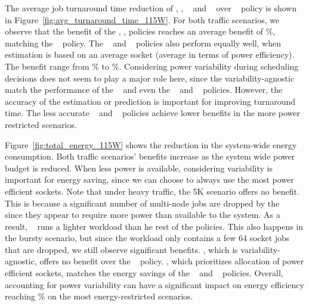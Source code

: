 The average job turnaround time reduction of \PESched, \PEVASched, \PRVSSched~ and \PMCVSSched~ over \DefaultSched~ policy is shown in Figure~\ref{fig:avg_turnaround_time_115W}. 
For both traffic scenarios, we observe that the benefit of the  \PESched, \PEVASched, policies reaches an average benefit of \AvgJTT\%, matching the \IVSSched~ policy.  
The \PESched~ and \PEVASched~ policies also perform equally well, when estimation is based on an average socket (average in terms of power efficiency).
The benefit range from \EstMaxJTT\% to \EstMinJTT\%.
Considering power variability during scheduling decisions does not seem to play a major role here, since the variability-agnostic \PESched~ match the performance of the \PEVASched~ and even 
the \PRVSSched~ and \PMCVSSched~ policies.  However, the accuracy of the estimation or prediction is important for improving turnaround time.  The less accurate  \PESched~ and \PEVASched~ policies achieve lower benefits in the more power restricted scenarios.

Figure~\ref{fig:total_energy_115W} shows the reduction in the system-wide energy consumption.  
Both traffic scenarios' benefits increase as the system wide power budget is reduced.
When less power is available, considering variability is important for energy saving, since we can choose to always use the most power efficient sockets.  
Note that under heavy traffic, the 5K scenario offers no benefit.  This is because a significant number of multi-node jobs are dropped by the \DefaultSched~ since they appear to require more 
power than available to the system.  As a result, \DefaultSched~ runs a lighter workload than he rest of the policies.  This also happens in the bursty scenario, but since the workload only contains
a few 64 socket jobs that are dropped, we still observe significant benefits. 
\PESched, which is variability-agnostic, offers no benefit over the \DefaultSched~ policy.  \PEVASched, which prioritizes allocation of power efficient sockets, 
matches the energy savings of the \PRVSSched~ and \PMCVSSched~ policies.
Overall, accounting for power variability can have a significant impact on energy efficiency reaching \MaxEnergy\% on the most energy-restricted scenarios.


